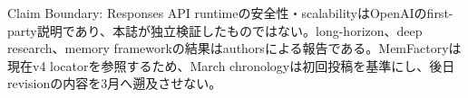 \begin{claimboundary}
Claim Boundary: Responses API runtimeの安全性・scalabilityはOpenAIのfirst-party説明であり、本誌が独立検証したものではない。long-horizon、deep research、memory frameworkの結果はauthorsによる報告である。MemFactoryは現在v4 locatorを参照するため、March chronologyは初回投稿を基準にし、後日revisionの内容を3月へ遡及させない。\autocite{src-01572b4c34e9,src-0ec537ec1cc1,src-2b8b39e5cae3,src-42318ebdee75}
\end{claimboundary}
